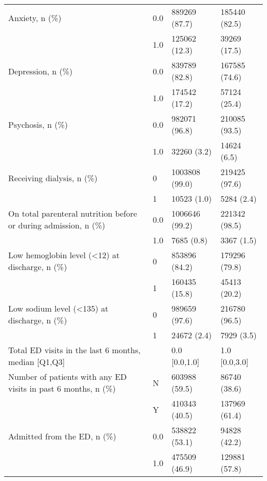 \begin{tabular}{llll}
Anxiety, n (\%) & 0.0 &                  889269 (87.7) &     185440 (82.5) \\
                                       & 1.0 &                  125062 (12.3) &      39269 (17.5) \\
Depression, n (\%) & 0.0 &                  839789 (82.8) &     167585 (74.6) \\
                                       & 1.0 &                  174542 (17.2) &      57124 (25.4) \\
Psychosis, n (\%) & 0.0 &                  982071 (96.8) &     210085 (93.5) \\
                                       & 1.0 &                    32260 (3.2) &       14624 (6.5) \\
Receiving dialysis, n (\%) & 0 &                 1003808 (99.0) &     219425 (97.6) \\
                                       & 1 &                    10523 (1.0) &        5284 (2.4) \\
On total parenteral nutrition before or during admission, n (\%) & 0.0 &                 1006646 (99.2) &     221342 (98.5) \\
                                       & 1.0 &                     7685 (0.8) &        3367 (1.5) \\
Low hemoglobin level (<12) at discharge, n (\%) & 0 &                  853896 (84.2) &     179296 (79.8) \\
                                       & 1 &                  160435 (15.8) &      45413 (20.2) \\
Low sodium level (<135) at discharge, n (\%) & 0 &                  989659 (97.6) &     216780 (96.5) \\
                                       & 1 &                    24672 (2.4) &        7929 (3.5) \\
Total ED visits in the last 6 months, median [Q1,Q3] &   &                  0.0 [0.0,1.0] &     1.0 [0.0,3.0] \\
Number of patients with any ED visits in past 6 months, n (\%) & N &                  603988 (59.5) &      86740 (38.6) \\
                                       & Y &                  410343 (40.5) &     137969 (61.4) \\
Admitted from the ED, n (\%) & 0.0 &                  538822 (53.1) &      94828 (42.2) \\
                                       & 1.0 &                  475509 (46.9) &     129881 (57.8) \\

\end{tabular}
